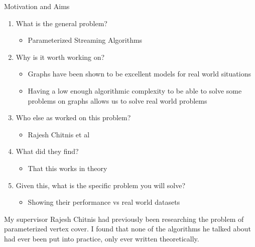Motivation and Aims

\begin{enumerate}
    \item What is the general problem?
    \begin{itemize}
        \item Parameterized Streaming Algorithms
    \end{itemize}
    \item Why is it worth working on?
    \begin{itemize}
        \item Graphs have been shown to be excellent models for real world situations
        \item Having a low enough algorithmic complexity to be able to solve some problems on graphs allows us to solve real world problems
    \end{itemize}
    \item Who else as worked on this problem?
    \begin{itemize}
        \item Rajesh Chitnis et al
    \end{itemize}
    \item What did they find?
    \begin{itemize}
        \item That this works in theory 
    \end{itemize}
    \item Given this, what is the specific problem you will solve?
    \begin{itemize}
        \item Showing their performance vs real world datasets 
    \end{itemize}
\end{enumerate}


My supervisor Rajesh Chitnis had previously been researching the problem of parameterized vertex cover. I found that none of the algorithms he talked about had ever been put into practice, only ever written theoretically. 